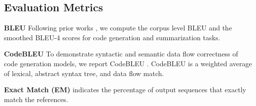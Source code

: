 \documentclass[11pt]{article}
\begin{document}
\subsection{Evaluation Metrics}
\noindent\textbf{BLEU\hspace{0.5em}} 
Following prior works \cite{ahmad2021unified, feng2020codebert}, we compute the corpus level BLEU \cite{papineni-etal-2002-bleu} and the smoothed BLEU-4 \cite{lin-och-2004-orange} scores for code generation and summarization tasks.



\smallskip
\noindent\textbf{{CodeBLEU}\hspace{0.5em}} 
To demonstrate syntactic and semantic data flow correctness of code generation models, we report CodeBLEU \cite{ren2020codebleu}.
CodeBLEU is a weighted average of lexical, abstract syntax tree, and data flow match.





\smallskip
\noindent\textbf{{Exact Match (EM)}\hspace{0.5em}} 
indicates the percentage of output sequences that exactly match the references.
\end{document}
